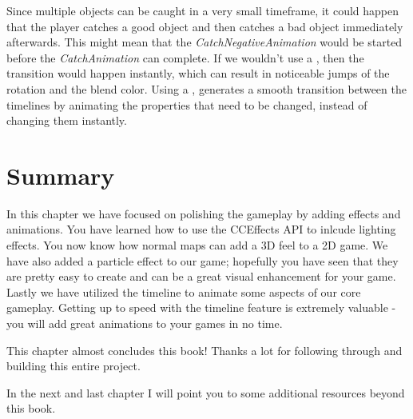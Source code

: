 Since multiple objects can be caught in a very small timeframe, it could happen
that the player catches a good object and then catches a bad object immediately
afterwards. This might mean that the \textit{CatchNegativeAnimation} would be
started before the \textit{CatchAnimation} can complete. If we wouldn't use a
, then the transition would happen instantly, which
can result in noticeable jumps of the rotation and the blend color. Using a
, \cocos{} generates a smooth transition between the 
timelines by animating the properties that need to be changed, instead of changing 
them instantly.

\section{Summary}

In this chapter we have focused on polishing the gameplay by adding effects and
animations. You have learned how to use the CCEffects API to inlcude lighting
effects. You now know how normal maps can add a 3D feel to a 2D game. We have
also added a particle effect to our game; hopefully you have seen that they are
pretty easy to create and can be a great visual enhancement for your game.
Lastly we have utilized the \SB{} timeline to animate some aspects of our core
gameplay. Getting up to speed with the timeline feature is extremely valuable -
you will add great animations to your games in no time.

This chapter almost concludes this book! Thanks a lot for following through and
building this entire project.

In the next and last chapter I will point you to some additional resources
beyond this book.
